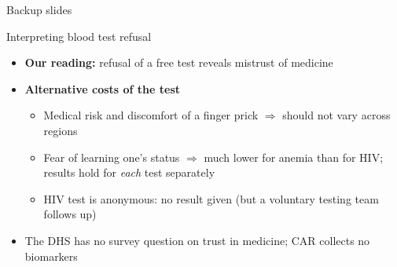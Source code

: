 \documentclass[aspectratio=1610]{beamer}
\newcommand{\returnbutton}[1]{\par\vfill\hfill\hyperlink{#1}{\beamerreturnbutton{Back}}}
\begin{document}
\begin{frame}[plain]
  \centering
  \vfill
  {\Huge Backup slides}
  \vfill
\end{frame}

\begin{frame}[label=bk-interpretation]{Interpreting blood test refusal}
  \begin{itemize}
    \item \textbf{Our reading:} refusal of a free test reveals mistrust of medicine
    \item \textbf{Alternative costs of the test}
      \begin{itemize}
        \item Medical risk and discomfort of a finger prick $\Rightarrow$ should not vary across regions
        \item Fear of learning one's status $\Rightarrow$ much lower for anemia than for HIV;
          results hold for \emph{each} test separately
        \item HIV test is anonymous: no result given (but a voluntary testing team follows up)
      \end{itemize}
    \item The DHS has no survey question on trust in medicine; CAR collects no biomarkers
  \end{itemize}
  \returnbutton{main-outcomes}
\end{frame}
\end{document}
